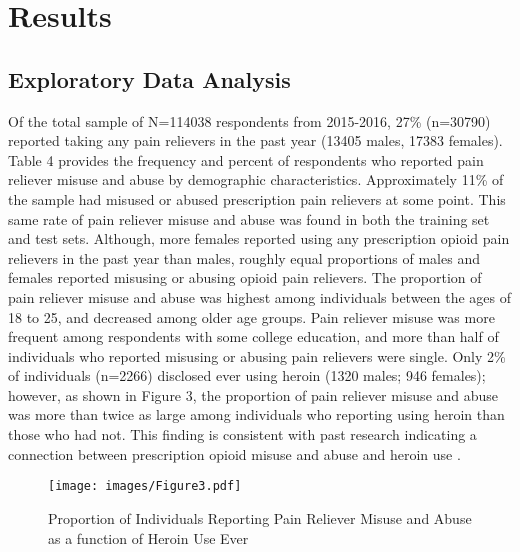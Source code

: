 \documentclass[sigconf]{acmart}
\begin{document}

\section{Results}

\subsection{Exploratory Data Analysis}

Of the total sample of N=114038 respondents from 2015-2016, 27\% (n=30790) 
reported taking any pain relievers in the past year (13405 males, 17383 
females). Table 4 provides the frequency and percent of respondents who 
reported pain reliever misuse and abuse by demographic characteristics. 
Approximately 11\% of the sample had misused or abused prescription pain 
relievers at some point. This same rate of pain reliever misuse and abuse 
was found in both the training set and test sets. Although, more females 
reported using any prescription opioid pain relievers in the past year than 
males, roughly equal proportions of males and females reported misusing or 
abusing opioid pain relievers. The proportion of pain reliever misuse and 
abuse was highest among individuals between the ages of 18 to 25, and 
decreased among older age groups. Pain reliever misuse was more frequent
among respondents with some college education, and more than half of
individuals who reported misusing or abusing pain relievers were single. 
Only 2\% of individuals (n=2266) disclosed ever using heroin (1320 males; 
946 females); however, as shown in Figure 3, the proportion of pain 
reliever misuse and abuse was more than twice as large among individuals
who reporting using heroin than those who had not. This finding is
consistent with past research indicating a connection between prescription
opioid misuse and abuse and heroin use \cite{muhuri13, unick13}.



\begin{figure}[!ht]
  \centering\texttt{[image: images/Figure3.pdf]}
  \caption{Proportion of Individuals Reporting Pain Reliever Misuse and Abuse
  as a function of Heroin Use Ever}
  \label{f:Figure3}
\end{figure}
 
 
\end{document}
